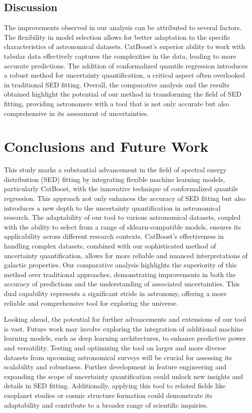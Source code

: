 \documentclass[letterpaper]{article} %
\begin{document}
\subsection{Discussion}
The improvements observed in our analysis can be attributed to several factors. The flexibility in model selection allows for better adaptation to the specific characteristics of astronomical datasets. CatBoost's superior ability to work with tabular data effectively captures the complexities in the data, leading to more accurate predictions. The addition of conformalized quantile regression introduces a robust method for uncertainty quantification, a critical aspect often overlooked in traditional SED fitting.  Overall, the comparative analysis and the results obtained highlight the potential of our method in transforming the field of SED fitting, providing astronomers with a tool that is not only accurate but also comprehensive in its assessment of uncertainties.

\vspace{-0.75mm}
\section{Conclusions and Future Work}

This study marks a substantial advancement in the field of spectral energy distribution (SED) fitting by integrating flexible machine learning models, particularly CatBoost, with the innovative technique of conformalized quantile regression. This approach not only enhances the accuracy of SED fitting but also introduces a new depth to the uncertainty quantification in astronomical research. The adaptability of our tool to various astronomical datasets, coupled with the ability to select from a range of sklearn-compatible models, ensures its applicability across different research contexts. CatBoost's effectiveness in handling complex datasets, combined with our sophisticated method of uncertainty quantification, allows for more reliable and nuanced interpretations of galactic properties.  Our comparative analysis highlights the superiority of this method over traditional approaches, demonstrating improvements in both the accuracy of predictions and the understanding of associated uncertainties. This dual capability represents a significant stride in astronomy, offering a more reliable and comprehensive tool for exploring the universe.

Looking ahead, the potential for further advancements and extensions of our tool is vast. Future work may involve exploring the integration of additional machine learning models, such as deep learning architectures, to enhance predictive power and versatility. Testing and optimizing the tool on larger and more diverse datasets from upcoming astronomical surveys will be crucial for assessing its scalability and robustness. Further development in feature engineering and expanding the scope of uncertainty quantification could unlock new insights and details in SED fitting. Additionally, applying this tool to related fields like exoplanet studies or cosmic structure formation could demonstrate its adaptability and contribute to a broader range of scientific inquiries.
\end{document}
